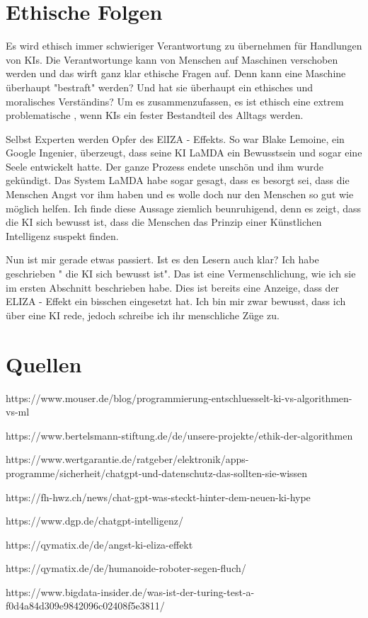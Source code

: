 \documentclass{report}
\begin{document}
\section{Ethische Folgen}
Es wird ethisch immer schwieriger Verantwortung zu übernehmen für Handlungen von KIs. Die Verantwortunge kann von Menschen auf Maschinen verschoben werden und das wirft ganz klar ethische Fragen auf. Denn kann eine Maschine überhaupt "bestraft" werden? Und hat sie überhaupt ein ethisches und moralisches Verständins? Um es zusammenzufassen, es ist ethisch eine extrem problematische , wenn KIs ein fester Bestandteil des Alltags werden.
\par
Selbst Experten werden Opfer des ElIZA - Effekts. So war Blake Lemoine, ein Google Ingenier,  überzeugt, dass seine KI LaMDA ein Bewusstsein und sogar eine Seele entwickelt hatte. Der ganze Prozess endete unschön und ihm wurde gekündigt. Das System LaMDA habe sogar gesagt, dass es besorgt sei, dass die Menschen Angst vor ihm haben und es wolle doch nur den Menschen so gut wie möglich helfen. Ich finde diese Aussage ziemlich beunruhigend, denn es zeigt, dass die KI sich bewusst ist, dass die Menschen das Prinzip einer Künstlichen Intelligenz suspekt finden. 
\par
Nun ist mir gerade etwas passiert. Ist es den Lesern auch klar? Ich habe geschrieben " die KI sich bewusst ist". Das ist eine Vermenschlichung, wie ich sie im ersten Abschnitt beschrieben habe. Dies ist bereits eine Anzeige, dass der ELIZA - Effekt ein bisschen eingesetzt hat. Ich bin mir zwar bewusst, dass ich über eine KI rede, jedoch schreibe ich ihr menschliche Züge zu. 

\section{Quellen}
\par 
https://www.mouser.de/blog/programmierung-entschluesselt-ki-vs-algorithmen-vs-ml
\par
https://www.bertelsmann-stiftung.de/de/unsere-projekte/ethik-der-algorithmen
\par
https://www.wertgarantie.de/ratgeber/elektronik/apps-programme/sicherheit/chatgpt-und-datenschutz-das-sollten-sie-wissen
\par
https://fh-hwz.ch/news/chat-gpt-was-steckt-hinter-dem-neuen-ki-hype
\par
https://www.dgp.de/chatgpt-intelligenz/
\par
https://qymatix.de/de/angst-ki-eliza-effekt
\par
https://qymatix.de/de/humanoide-roboter-segen-fluch/
\par
https://www.bigdata-insider.de/was-ist-der-turing-test-a-f0d4a84d309e9842096c02408f5e3811/

\printbibliography
\end{document}

